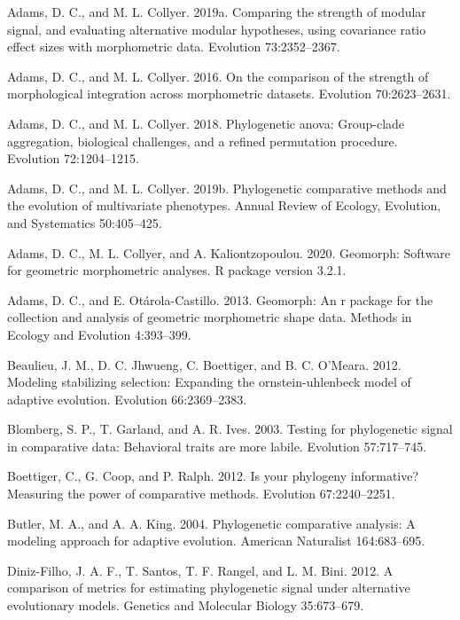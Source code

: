 \documentclass[
]{article}
\begin{document}
\leavevmode\hypertarget{ref-AdamsCollyer2019b}{}%
Adams, D. C., and M. L. Collyer. 2019a. Comparing the strength of
modular signal, and evaluating alternative modular hypotheses, using
covariance ratio effect sizes with morphometric data. Evolution
73:2352--2367.

\leavevmode\hypertarget{ref-AdamsCollyer2016}{}%
Adams, D. C., and M. L. Collyer. 2016. On the comparison of the strength
of morphological integration across morphometric datasets. Evolution
70:2623--2631.

\leavevmode\hypertarget{ref-AdamsCollyer2018b}{}%
Adams, D. C., and M. L. Collyer. 2018. Phylogenetic anova: Group-clade
aggregation, biological challenges, and a refined permutation procedure.
Evolution 72:1204--1215.

\leavevmode\hypertarget{ref-AdamsCollyer2019}{}%
Adams, D. C., and M. L. Collyer. 2019b. Phylogenetic comparative methods
and the evolution of multivariate phenotypes. Annual Review of Ecology,
Evolution, and Systematics 50:405--425.

\leavevmode\hypertarget{ref-AdamsGeomorph}{}%
Adams, D. C., M. L. Collyer, and A. Kaliontzopoulou. 2020. Geomorph:
Software for geometric morphometric analyses. R package version 3.2.1.

\leavevmode\hypertarget{ref-AdamsOtarola2013}{}%
Adams, D. C., and E. Otárola-Castillo. 2013. Geomorph: An r package for
the collection and analysis of geometric morphometric shape data.
Methods in Ecology and Evolution 4:393--399.

\leavevmode\hypertarget{ref-Beaulieu_et_al2012}{}%
Beaulieu, J. M., D. C. Jhwueng, C. Boettiger, and B. C. O'Meara. 2012.
Modeling stabilizing selection: Expanding the ornstein-uhlenbeck model
of adaptive evolution. Evolution 66:2369--2383.

\leavevmode\hypertarget{ref-Blomberg_et_al2003}{}%
Blomberg, S. P., T. Garland, and A. R. Ives. 2003. Testing for
phylogenetic signal in comparative data: Behavioral traits are more
labile. Evolution 57:717--745.

\leavevmode\hypertarget{ref-Boettiger_et_al2012}{}%
Boettiger, C., G. Coop, and P. Ralph. 2012. Is your phylogeny
informative? Measuring the power of comparative methods. Evolution
67:2240--2251.

\leavevmode\hypertarget{ref-ButlerKing2004}{}%
Butler, M. A., and A. A. King. 2004. Phylogenetic comparative analysis:
A modeling approach for adaptive evolution. American Naturalist
164:683--695.

\leavevmode\hypertarget{ref-DinizFilho2012}{}%
Diniz-Filho, J. A. F., T. Santos, T. F. Rangel, and L. M. Bini. 2012. A
comparison of metrics for estimating phylogenetic signal under
alternative evolutionary models. Genetics and Molecular Biology
35:673--679.
\end{document}
